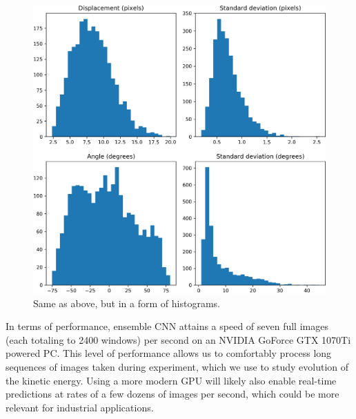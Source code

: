 \documentclass{svjour3}                     %
\begin{document}
\begin{figure}
\includegraphics[width=\textwidth]{figs/figure8b.png}
\caption{Same as above, but in a form of histograms.}
\label{fig:fig9b}
\end{figure}

In terms of performance, ensemble CNN attains a speed of seven full images (each totaling to 2400 windows) per second on an NVIDIA GoForce GTX 1070Ti powered PC. This level of performance allows us to comfortably process long sequences of images taken during experiment, which we use to study evolution of the kinetic energy. Using a more modern GPU will likely also enable real-time predictions at rates of a few dozens of images per second, which could be more relevant for industrial applications.
\end{document}
